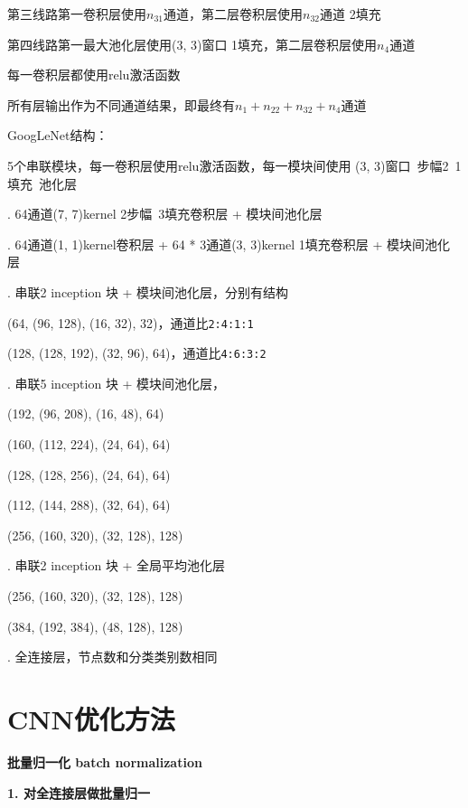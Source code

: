 \documentclass[UTF8]{ctexart}
\begin{document}
  \quad \quad 第三线路第一卷积层使用$n_{31}$通道，第二层卷积层使用$n_{32}$通道 2填充
  
  \quad \quad 第四线路第一最大池化层使用(3, 3)窗口 1填充，第二层卷积层使用$n_4$通道

  \quad 每一卷积层都使用relu激活函数

  \quad 所有层输出作为不同通道结果，即最终有$n_1 + n_{22} + n_{32} + n_4$通道

  GoogLeNet结构：

  \quad 5个串联模块，每一卷积层使用relu激活函数，每一模块间使用 (3, 3)窗口\ 步幅2\ 1填充\ 池化层

  . 64通道(7, 7)kernel 2步幅\ 3填充卷积层 + 模块间池化层

  . 64通道(1, 1)kernel卷积层 + 64 * 3通道(3, 3)kernel 1填充卷积层 + 模块间池化层

  . 串联2 inception 块 + 模块间池化层，分别有结构

  \quad \quad (64, (96, 128), (16, 32), 32)，通道比\texttt{2:4:1:1}

  \quad \quad (128, (128, 192), (32, 96), 64)，通道比\texttt{4:6:3:2}

  . 串联5 inception 块 + 模块间池化层，

  \quad \quad (192, (96, 208), (16, 48), 64)

  \quad \quad (160, (112, 224), (24, 64), 64)

  \quad \quad (128, (128, 256), (24, 64), 64)

  \quad \quad (112, (144, 288), (32, 64), 64)

  \quad \quad (256, (160, 320), (32, 128), 128)

  . 串联2 inception 块 + 全局平均池化层

  \quad \quad (256, (160, 320), (32, 128), 128)

  \quad \quad (384, (192, 384), (48, 128), 128)

  . 全连接层，节点数和分类类别数相同

\section{CNN优化方法}
\noindent \textbf{批量归一化 batch normalization}

  \textbf{1. 对全连接层做批量归一}
\end{document}
